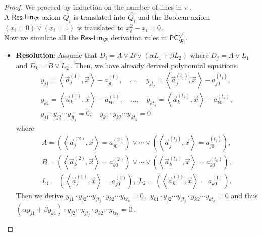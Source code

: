 \documentclass{toc}
\begin{document}
\begin{proof}
We proceed by induction on the number of lines in %
$\pi\,.$ %
\mbox{}\\  A $\mathsf{Res}$-$\mathsf{Lin}_\Z$ axiom $Q_i$ is translated into $\widehat{Q_i}$ and the Boolean axiom  $(x_i = 0) \vee (x_i = 1)$ is translated to %
$x_i^2 - x_i = 0\,.$ %
\mbox{}\\  Now we simulate all the $\mathsf{Res}$-$\mathsf{Lin}_\Z$ derivation rules in %
$\mathsf{PC}_{\Q}^{\surd}\,.$ %
\begin{itemize}
    \item \textbf{Resolution}: Assume that $D_i = A \vee B \vee (\alpha L_1 + \beta L_2)$ where $D_j = A \vee L_1$ and %
$D_k = B \vee L_2\,.$ %
 Then, we have already derived polynomial equations
    \begin{align*}
    y_{j 1} = \left\langle \vec a_j^{(1)}, \vec x \right \rangle - a_{j 0}^{(1)}, \quad \ldots, \quad y_{j t_j} = \left \langle \vec a_j^{(t_j)}, \vec x \right \rangle - a_{j 0}^{(t_j)},\\
    y_{k 1} = \left \langle \vec a_k^{(1)}, \vec x \right \rangle - a_{k 0}^{(1)}, \quad \ldots, \quad y_{k t_k} = \left \langle \vec a_k^{(t_k)}, \vec x \right \rangle - a_{k 0}^{(t_k)},\\ %
    y_{j 1} \cdot y_{j 2} \cdots y_{j t_j} = 0, \quad y_{k 1} \cdot y_{k 2} \cdots y_{k t_k} = 0
    \end{align*}
    where 
	\begin{align*}
    A = \left( \left\langle \vec a_j^{(2)}, \vec x \right \rangle = a_{j 0}^{(2)}\right) \vee \cdots \vee \left( \left\langle \vec a_j^{(t_j)}, \vec x \right \rangle = a_{j 0}^{(t_j)}\right), \\
    B = \left( \left\langle \vec a_k^{(2)}, \vec x \right \rangle = a_{k 0}^{(2)}\right) \vee \cdots \vee \left( \left\langle \vec a_k^{(t_k)}, \vec x \right \rangle = a_{k 0}^{(t_k)}\right), \\
    L_1 = \left( \left\langle \vec a_j^{(1)}, \vec x \right \rangle = a_{j 0}^{(1)}\right), \; L_2 = \left( \left\langle \vec a_k^{(1)}, \vec x \right \rangle = a_{k 0}^{(1)}\right).
    \end{align*}
    Then we derive %
$y_{j 1} \cdot y_{j 2} \cdots y_{j t_j} \cdot y_{k 2} \cdots y_{k t_k} = 0\,,$ %
 $y_{k 1} \cdot y_{j 2} \cdots y_{j t_j} \cdot y_{k 2} \cdots y_{k t_k} = 0$ and thus %
$(\alpha y_{j 1} + \beta y_{k 1}) \cdot y_{j 2} \cdots y_{j t_j} \cdot y_{k 2} \cdots y_{k t_k} = 0\,.$ %

\end{itemize}
\end{proof}
\end{document}
